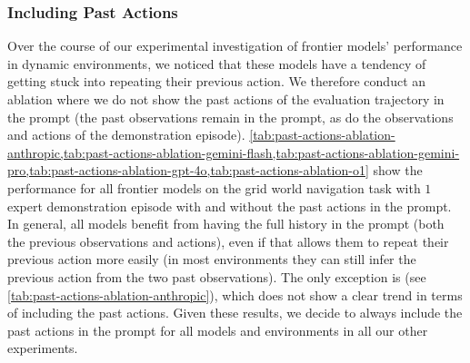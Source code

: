 \begin{table}
    \caption{
        Ablating the use of chain-of-thought prompting and whether or not to show legal actions in the prompt for \gpt{}, \mini{}, \preview{}, and \oone{} on the grid world navigation task.
        The best-performing setting is model and observation dependent.
        Note that \mini{} and \preview{} are text-only and, therefore, cannot process RGB observations.
    }
    \begin{center}
        \resizebox{0.55\textwidth}{!}{}
    \end{center}
    \label{tab:grid-world-ablation-openai}
\end{table}

\begin{table}
    \caption{
        Ablating the use of chain-of-thought prompting and whether or not to show legal actions in the prompt for the game of tic-tac-toe.
        Across almost all models and observations types, using chain-of-thought prompting and showing the legal actions achieves the highest performance -- often by a large margin.
        Note that \mini{} and \preview{} are text-only and, therefore, cannot process RGB observations.
    }
    \begin{center}
        \resizebox{0.55\textwidth}{!}{}
    \end{center}
    \label{tab:tic-tac-toe-ablation}
\end{table}


\subsubsection{Including Past Actions}
\label{app:additional-results:past-actions-ablation}

Over the course of our experimental investigation of frontier models' performance in dynamic environments, we noticed that these models have a tendency of getting stuck into repeating their previous action.
We therefore conduct an ablation where we do not show the past actions of the evaluation trajectory in the prompt (the past observations remain in the prompt, as do the observations and actions of the demonstration episode).
\cref{tab:past-actions-ablation-anthropic,tab:past-actions-ablation-gemini-flash,tab:past-actions-ablation-gemini-pro,tab:past-actions-ablation-gpt-4o,tab:past-actions-ablation-o1} show the performance for all frontier models on the grid world navigation task with $1$ expert demonstration episode with and without the past actions in the prompt.
In general, all models benefit from having the full history in the prompt (\ie both the previous observations and actions), even if that allows them to repeat their previous action more easily (in most environments they can still infer the previous action from the two past observations).
The only exception is \claude{} (see \cref{tab:past-actions-ablation-anthropic}), which does not show a clear trend in terms of including the past actions.
Given these results, we decide to always include the past actions in the prompt for all models and environments in all our other experiments.

